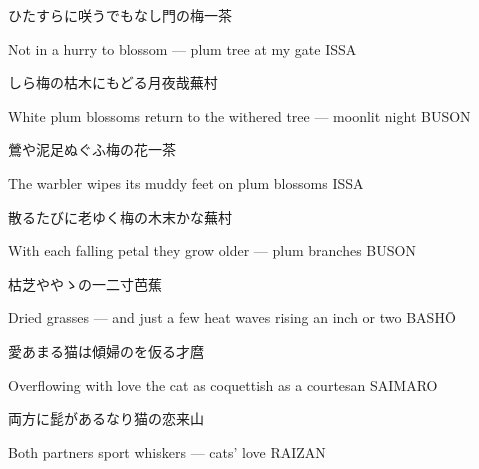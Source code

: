 \begin{haiku}
    {\FH ひたすらに咲うでもなし門の梅}\hfill{\FH 一茶}

    \vin{} Not in a hurry
    \vin{} \vin{} to blossom ---
    \vin{} \vin{} \vin{} plum tree at my gate \hspace{\fill} ISSA
\end{haiku}

\begin{haiku}
    {\FH しら梅の枯木にもどる月夜哉}\hfill{\FH 蕪村}

    \vin{} White plum blossoms
    \vin{} \vin{} return to the withered tree ---
    \vin{} \vin{} \vin{} moonlit night \hspace{\fill} BUSON
\end{haiku}

\begin{haiku}
    {\FH 鶯や泥足ぬぐふ梅の花}\hfill{\FH 一茶}

    \vin{} The warbler
    \vin{} \vin{} wipes its muddy feet
    \vin{} \vin{} \vin{} on plum blossoms \hspace{\fill} ISSA
\end{haiku}

\begin{haiku}
    {\FH 散るたびに老ゆく梅の木末かな}\hfill{\FH 蕪村}

    \vin{} With each falling petal
    \vin{} \vin{} they grow older ---
    \vin{} \vin{} \vin{} plum branches \hspace{\fill} BUSON
\end{haiku}

\begin{haiku}
    {\FH 枯芝ややゝの一二寸}\hfill{\FH 芭蕉}

    \vin{} Dried grasses ---
    \vin{} \vin{} and just a few heat waves
    \vin{} \vin{} \vin{} rising an inch or two \hspace{\fill} BASH\={O}
\end{haiku}

\begin{haiku}
    {\FH 愛あまる猫は傾婦のを仮る}\hfill{\FH 才麿}

    \vin{} Overflowing with love
    \vin{} \vin{} the cat as coquettish
    \vin{} \vin{} \vin{} as a courtesan \hspace{\fill} SAIMARO
\end{haiku}

\begin{haiku}
    {\FH 両方に髭があるなり猫の恋}\hfill{\FH 来山}

    \vin{} Both partners
    \vin{} \vin{} sport whiskers ---
    \vin{} \vin{} \vin{} cats' love \hspace{\fill} RAIZAN
\end{haiku}

